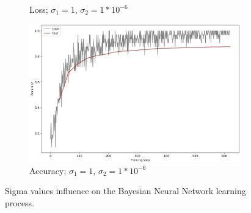 \begin{figure}[]
\begin{subfigure}[b]{0.48\textwidth}
         \caption{Loss; $\sigma_1=1$, $\sigma_2=1*10^{-6}$}
     \end{subfigure}
     \hfill
     \begin{subfigure}[b]{0.48\textwidth}
         \centering
         \includegraphics[width=\textwidth]{observational/img/bnn/sigmas/AC_default.png}
         \caption{Accuracy; $\sigma_1=1$, $\sigma_2=1*10^{-6}$}
     \end{subfigure}
     \caption[Sigma values influence on the BNN learning process]{Sigma values influence on the Bayesian Neural Network learning process.}
    \label{fig:bnn-sigmas}
\end{figure}

